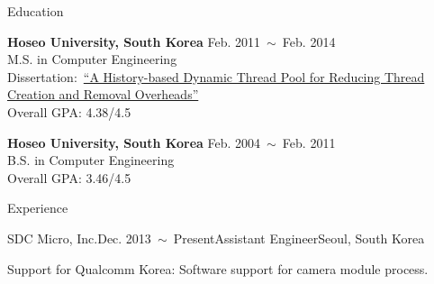 \documentclass{resume} %
\begin{document}

\begin{rSection}{Education}

{\bf Hoseo University, South Korea} \hfill Feb. 2011~$\sim$~Feb. 2014 \\
M.S. in Computer Engineering \\
Dissertation:~\href{http://dlibrary.hoseo.ac.kr/search/searchDetail.do?rec_key=SH1_000000950591}
{\footnotesize ``A History-based Dynamic Thread Pool for Reducing Thread Creation and Removal Overheads''} \\
Overall GPA: 4.38/4.5

{\bf Hoseo University, South Korea} \hfill Feb. 2004~$\sim$~Feb. 2011 \\
B.S. in Computer Engineering \\
Overall GPA: 3.46/4.5

\end{rSection}


\begin{rSection}{Experience}



  \begin{rSubsection}{SDC Micro, Inc.}{Dec. 2013~$\sim$~Present}{Assistant Engineer}{Seoul, South Korea}
  \item Support for Qualcomm Korea: Software support for camera module process.
  \end{rSubsection}

\end{rSection}

\end{document}
